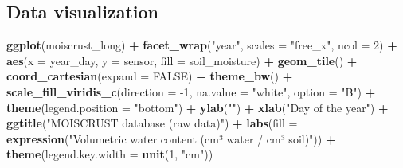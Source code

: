 \documentclass[]{article}
\newenvironment{Shaded}{\begin{snugshade}}{\end{snugshade}}
\newcommand{\DataTypeTok}[1]{\textcolor[rgb]{0.13,0.29,0.53}{#1}}
\newcommand{\DecValTok}[1]{\textcolor[rgb]{0.00,0.00,0.81}{#1}}
\newcommand{\KeywordTok}[1]{\textcolor[rgb]{0.13,0.29,0.53}{\textbf{#1}}}
\newcommand{\NormalTok}[1]{#1}
\newcommand{\OperatorTok}[1]{\textcolor[rgb]{0.81,0.36,0.00}{\textbf{#1}}}
\newcommand{\OtherTok}[1]{\textcolor[rgb]{0.56,0.35,0.01}{#1}}
\newcommand{\StringTok}[1]{\textcolor[rgb]{0.31,0.60,0.02}{#1}}
\begin{document}
\hypertarget{data-visualization}{%
\subsection{Data visualization}\label{data-visualization}}

\begin{Shaded}
\begin{Highlighting}[]
\KeywordTok{ggplot}\NormalTok{(moiscrust_long) }\OperatorTok{+}\StringTok{ }
\StringTok{  }\KeywordTok{facet_wrap}\NormalTok{(}\StringTok{"year"}\NormalTok{, }\DataTypeTok{scales =} \StringTok{"free_x"}\NormalTok{, }\DataTypeTok{ncol =} \DecValTok{2}\NormalTok{) }\OperatorTok{+}
\StringTok{  }\KeywordTok{aes}\NormalTok{(}\DataTypeTok{x =}\NormalTok{ year_day, }\DataTypeTok{y =}\NormalTok{ sensor, }\DataTypeTok{fill =}\NormalTok{ soil_moisture) }\OperatorTok{+}\StringTok{ }
\StringTok{  }\KeywordTok{geom_tile}\NormalTok{() }\OperatorTok{+}\StringTok{ }
\StringTok{  }\KeywordTok{coord_cartesian}\NormalTok{(}\DataTypeTok{expand =} \OtherTok{FALSE}\NormalTok{) }\OperatorTok{+}
\StringTok{  }\KeywordTok{theme_bw}\NormalTok{() }\OperatorTok{+}\StringTok{ }
\StringTok{  }\KeywordTok{scale_fill_viridis_c}\NormalTok{(}\DataTypeTok{direction =} \DecValTok{-1}\NormalTok{, }\DataTypeTok{na.value =} \StringTok{"white"}\NormalTok{, }\DataTypeTok{option =} \StringTok{"B"}\NormalTok{) }\OperatorTok{+}\StringTok{ }
\StringTok{  }\KeywordTok{theme}\NormalTok{(}\DataTypeTok{legend.position =} \StringTok{"bottom"}\NormalTok{) }\OperatorTok{+}\StringTok{ }
\StringTok{  }\KeywordTok{ylab}\NormalTok{(}\StringTok{""}\NormalTok{) }\OperatorTok{+}\StringTok{ }
\StringTok{  }\KeywordTok{xlab}\NormalTok{(}\StringTok{"Day of the year"}\NormalTok{) }\OperatorTok{+}
\StringTok{  }\KeywordTok{ggtitle}\NormalTok{(}\StringTok{"MOISCRUST database (raw data)"}\NormalTok{) }\OperatorTok{+}
\StringTok{  }\KeywordTok{labs}\NormalTok{(}\DataTypeTok{fill =} \KeywordTok{expression}\NormalTok{(}\StringTok{"Volumetric water content (cm³ water / cm³ soil)"}\NormalTok{)) }\OperatorTok{+}\StringTok{ }
\StringTok{  }\KeywordTok{theme}\NormalTok{(}\DataTypeTok{legend.key.width =} \KeywordTok{unit}\NormalTok{(}\DecValTok{1}\NormalTok{, }\StringTok{"cm"}\NormalTok{))}
\end{Highlighting}
\end{Shaded}
\end{document}
